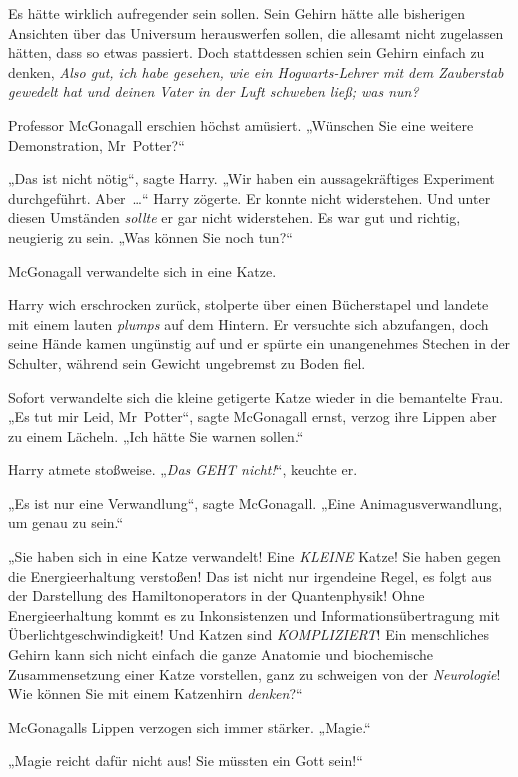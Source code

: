 Es hätte wirklich aufregender sein sollen. Sein Gehirn hätte alle bisherigen Ansichten über das Universum herauswerfen sollen, die allesamt nicht zugelassen hätten, dass so etwas passiert. Doch stattdessen schien sein Gehirn einfach zu denken, \emph{Also gut, ich habe gesehen, wie ein Hogwarts-Lehrer mit dem Zauberstab gewedelt hat und deinen Vater in der Luft schweben ließ; was nun?}

Professor McGonagall erschien höchst amüsiert. „Wünschen Sie eine weitere Demonstration, Mr~Potter?“

„Das ist nicht nötig“, sagte Harry. „Wir haben ein aussagekräftiges Experiment durchgeführt. Aber …“ Harry zögerte. Er konnte nicht widerstehen. Und unter diesen Umständen \emph{sollte} er gar nicht widerstehen. Es war gut und richtig, neugierig zu sein. „Was können Sie noch tun?“

McGonagall verwandelte sich in eine Katze.

Harry wich erschrocken zurück, stolperte über einen Bücherstapel und landete mit einem lauten \emph{plumps} auf dem Hintern. Er versuchte sich abzufangen, doch seine Hände kamen ungünstig auf und er spürte ein unangenehmes Stechen in der Schulter, während sein Gewicht ungebremst zu Boden fiel.

Sofort verwandelte sich die kleine getigerte Katze wieder in die bemantelte Frau. „Es tut mir Leid, Mr~Potter“, sagte McGonagall ernst, verzog ihre Lippen aber zu einem Lächeln. „Ich hätte Sie warnen sollen.“

Harry atmete stoßweise. „\emph{Das GEHT nicht!}“, keuchte er.

„Es ist nur eine Verwandlung“, sagte McGonagall. „Eine Animagusverwandlung, um genau zu sein.“

„Sie haben sich in eine Katze verwandelt! Eine \emph{KLEINE} Katze! Sie haben gegen die Energieerhaltung verstoßen! Das ist nicht nur irgendeine Regel, es folgt aus der Darstellung des Hamiltonoperators in der Quantenphysik! Ohne Energieerhaltung kommt es zu Inkonsistenzen und Informationsübertragung mit Überlichtgeschwindigkeit! Und Katzen sind \emph{KOMPLIZIERT}! Ein menschliches Gehirn kann sich nicht einfach die ganze Anatomie und biochemische Zusammensetzung einer Katze vorstellen, ganz zu schweigen von der \emph{Neurologie}! Wie können Sie mit einem Katzenhirn \emph{denken}?“

McGonagalls Lippen verzogen sich immer stärker. „Magie.“

„Magie reicht dafür nicht aus! Sie müssten ein Gott sein!“

